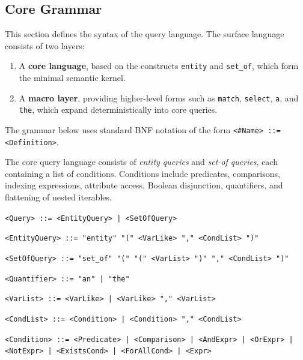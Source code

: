 \documentclass{article}
\begin{document}
\subsection{Core Grammar}

This section defines the syntax of the query language.  
The surface language consists of two layers:

\begin{enumerate}
\item A \textbf{core language}, based on the constructs \texttt{entity} and \texttt{set\_of},  
   which form the minimal semantic kernel.
\item A \textbf{macro layer}, providing higher-level forms such as \texttt{match}, \texttt{select},
   \texttt{a}, and \texttt{the}, which expand deterministically into core queries.
\end{enumerate}

The grammar below uses standard BNF notation of the form  
\texttt{<\#Name> ::= <Definition>}.

The core query language consists of \emph{entity queries} and \emph{set-of queries}, 
each containing a list of conditions.  
Conditions include predicates, comparisons, indexing expressions, attribute access,
Boolean disjunction, quantifiers, and flattening of nested iterables.

\newcommand{\bnfrule}[2]{%
  \par\noindent\hspace{1em}\texttt{\textless{}#1\textgreater{} ::= #2}
}

\bnfrule{Query}{\textless{}EntityQuery\textgreater{} | \textless{}SetOfQuery\textgreater{}}

\bnfrule{EntityQuery}{"entity" "(" \textless{}VarLike\textgreater{} "," \textless{}CondList\textgreater{} ")"}

\bnfrule{SetOfQuery}{"set\_of" "(" "(" \textless{}VarList\textgreater{} ")" "," \textless{}CondList\textgreater{} ")"}

\bnfrule{Quantifier}{"an" | "the"}

\bnfrule{VarList}{\textless{}VarLike\textgreater{} | \textless{}VarLike\textgreater{} "," \textless{}VarList\textgreater{}}

\bnfrule{CondList}{\textless{}Condition\textgreater{} | \textless{}Condition\textgreater{} "," \textless{}CondList\textgreater{}}

\bnfrule{Condition}{\textless{}Predicate\textgreater{} | \textless{}Comparison\textgreater{} | \textless{}AndExpr\textgreater{} | \textless{}OrExpr\textgreater{} | \textless{}NotExpr\textgreater{} | \textless{}ExistsCond\textgreater{} | \textless{}ForAllCond\textgreater{} | \textless{}Expr\textgreater{}}
\end{document}
